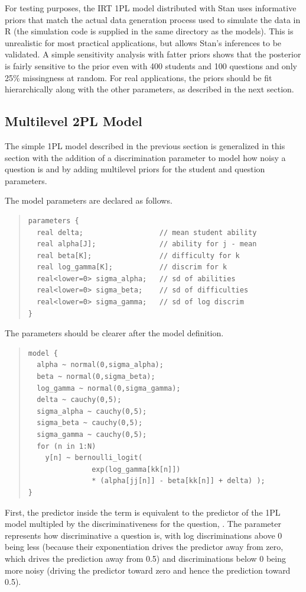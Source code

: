 For testing purposes, the IRT 1PL model distributed with Stan uses
informative priors that match the actual data generation process used
to simulate the data in R (the simulation code is supplied in the same
directory as the models).  This is unrealistic for most practical
applications, but allows Stan's inferences to be validated.  A simple
sensitivity analysis with fatter priors shows that the posterior is
fairly sensitive to the prior even with 400 students and 100 questions
and only 25\% missingness at random.  For real applications, the
priors should be fit hierarchically along with the other parameters,
as described in the next section.


\subsection{Multilevel 2PL Model}

The simple 1PL model described in the previous section is generalized
in this section with the addition of a discrimination parameter to
model how noisy a question is and by adding multilevel priors for the
student and question parameters.

The model parameters are declared as follows.
%
\begin{quote}
\begin{Verbatim}
parameters {    
  real delta;                  // mean student ability
  real alpha[J];               // ability for j - mean
  real beta[K];                // difficulty for k
  real log_gamma[K];           // discrim for k
  real<lower=0> sigma_alpha;   // sd of abilities
  real<lower=0> sigma_beta;    // sd of difficulties 
  real<lower=0> sigma_gamma;   // sd of log discrim
}
\end{Verbatim}
\end{quote}
%
The parameters should be clearer after the model definition.
%
\begin{quote}
\begin{Verbatim}
model {
  alpha ~ normal(0,sigma_alpha); 
  beta ~ normal(0,sigma_beta);   
  log_gamma ~ normal(0,sigma_gamma);
  delta ~ cauchy(0,5);
  sigma_alpha ~ cauchy(0,5);
  sigma_beta ~ cauchy(0,5);
  sigma_gamma ~ cauchy(0,5);
  for (n in 1:N)
    y[n] ~ bernoulli_logit( 
               exp(log_gamma[kk[n]])
               * (alpha[jj[n]] - beta[kk[n]] + delta) );
}
\end{Verbatim}
\end{quote}
%
First, the predictor inside the  term is
equivalent to the predictor of the 1PL model multipled by the
discriminativeness for the question, .
The parameter  represents how discriminative a
question is, with log discriminations above 0 being less (because
their exponentiation drives the predictor away from zero, which drives
the prediction away from 0.5) and discriminations below 0 being more
noisy (driving the predictor toward zero and hence the prediction
toward 0.5).

